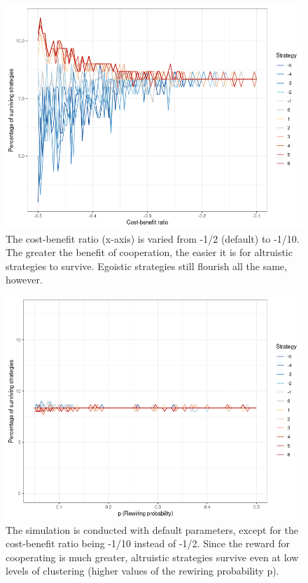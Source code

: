 \documentclass{JASSS}
\begin{document}
\begin{figure}
	\centering
	\includegraphics[width=\linewidth]{./figures/results_WS_N300_truthful_new_vary_cb.png}
	\caption{The cost-benefit ratio (x-axis) is varied from -1/2 (default) to -1/10. The greater the benefit of cooperation, the easier it is for altruistic strategies to survive. Egoistic strategies still flourish all the same, however.}
	\label{vary_cb}
\end{figure}
\begin{figure}
	\centering
	\includegraphics[width=\linewidth]{./figures/results_WS_N300_truthful_new_vary_p_cb_1_10.png}
	\caption{The simulation is conducted with default parameters, except for the cost-benefit ratio being -1/10 instead of -1/2. Since the reward for cooperating is much greater, altruistic strategies survive even at low levels of clustering (higher values of the rewiring probability p).}
	\label{cb1_10_vary_p}
\end{figure}
\end{document}
